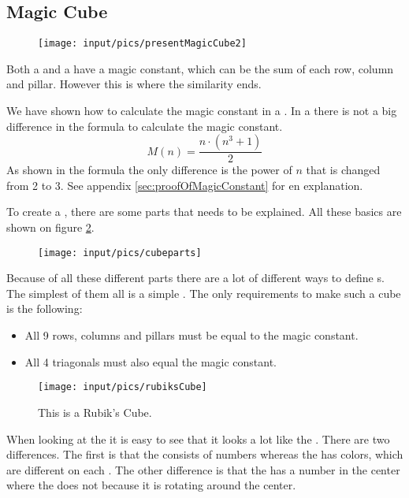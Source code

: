 \subsection{Magic Cube}

\begin{figure}[h]
	\centering
		\texttt{[image: input/pics/presentMagicCube2]}
	\caption{}
	\label{fig:presentMagicCube}
\end{figure}

Both a \msquare{} and a \mcube{} have a magic constant, which can be the sum of each row, column and pillar. However this is where the similarity ends.

We have shown how to calculate the magic constant in a \msquare{}.
In a  \mcube{} there is not a big difference in the formula to calculate the magic constant.
\begin{equation}
	M(n)=\frac{n \cdot (n^3+1)}{2}
\end{equation}
As shown in the formula the only difference is the power of $n$ that is changed from 2 to 3.
See appendix \ref{sec:proofOfMagicConstant} for en explanation.

To create a  \mcube{}, there are some parts that needs to be explained.
All these basics are shown on figure \ref{fig:cubeparts}.

\begin{figure}[h]
	\centering
		\texttt{[image: input/pics/cubeparts]}
	\caption{}
	\label{fig:cubeparts}
\end{figure}

Because of all these different parts there are a lot of different ways to define  \mcube{}s.
The simplest of them all is a simple  \mcube{}. The only requirements to make such a cube is the following:
\begin{itemize}
	\item All 9 rows, columns and pillars must be equal to the magic constant.
	\item All 4 triagonals must also equal the magic constant.
\end{itemize}

\begin{figure}[h]
	\centering
		\texttt{[image: input/pics/rubiksCube]}
	\caption{This is a Rubik's Cube.}
	\label{fig:rubiksCube}
\end{figure}

When looking at the \rubik{} it is easy to see that it looks a lot like the \mcube{}. 
There are two differences. 
The first is that the \mcube{} consists of numbers whereas the \rubik{} has colors, which are different on each \face{}.
The other difference is that the \mcube{} has a number in the center where the \rubik{} does not because it is rotating around the center. 
